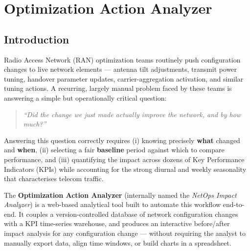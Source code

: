 %

\chapter{Optimization Action Analyzer}
\label{chap:opt-action-analyzer}

\section{Introduction}
Radio Access Network (RAN) optimization teams routinely push configuration
changes to live network elements --- antenna tilt adjustments, transmit
power tuning, handover parameter updates, carrier-aggregation activation,
and similar tuning actions. A recurring, largely manual problem faced by
these teams is answering a simple but operationally critical question:

\begin{quote}
\emph{``Did the change we just made actually improve the network, and by
how much?''}
\end{quote}

Answering this question correctly requires (i) knowing precisely
\textbf{what} changed and \textbf{when}, (ii) selecting a fair
\textbf{baseline} period against which to compare performance, and
(iii) quantifying the impact across dozens of Key Performance Indicators
(KPIs) while accounting for the strong diurnal and weekly seasonality that
characterises telecom traffic.

The \textbf{Optimization Action Analyzer} (internally named the
\emph{NetOps Impact Analyzer}) is a web-based analytical tool built to
automate this workflow end-to-end. It couples a version-controlled
database of network configuration changes with a KPI time-series
warehouse, and produces an interactive before/after impact analysis for
any configuration change --- without requiring the analyst to manually
export data, align time windows, or build charts in a spreadsheet.

